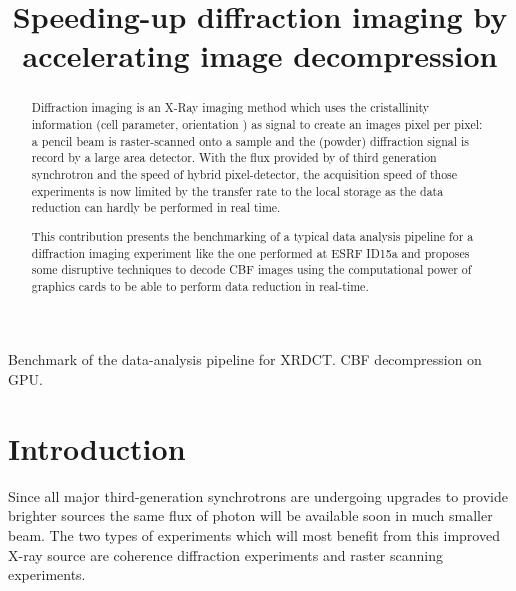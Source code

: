 \documentclass[preprint, pdf]{iucr}              %
\begin{document}

\title{Speeding-up diffraction imaging by accelerating image decompression}

 





\maketitle                        %

\begin{synopsis}
Benchmark of the data-analysis pipeline for XRDCT. CBF decompression on GPU.
\end{synopsis}

\begin{abstract}

Diffraction imaging is an X-Ray imaging method which uses the cristallinity
information (cell parameter, orientation ) as signal to create an images pixel
per pixel:
a pencil beam is raster-scanned onto a sample and the (powder) diffraction
signal is record by a large area detector. 
With the flux provided by of third generation synchrotron and the speed of
hybrid pixel-detector, the acquisition speed of those experiments is now 
limited by the transfer rate to the local storage as the data reduction can
hardly be performed in real time.

This contribution presents the benchmarking of a typical data
analysis pipeline for a diffraction imaging experiment like the one performed at
ESRF ID15a and proposes some disruptive techniques to decode CBF images using the
computational power of graphics cards to be able to perform data reduction in
real-time.
\end{abstract}


\section{Introduction}

Since all major third-generation synchrotrons are undergoing upgrades
to provide brighter sources \cite{ESRF-EBS, S8U} the same
flux of photon will be available soon in much smaller beam. 
The two types of experiments which will most benefit from this improved
X-ray source are coherence diffraction experiments and raster scanning
experiments.
\end{document}
